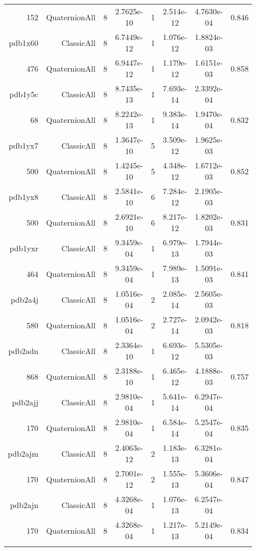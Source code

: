 \begin{xltabular}{\textwidth}{r|rcS[table-format=1.4e+2]cS[table-format=1.3e+2]S[table-format=1.4e+2]S[table-format=-1.3]}
152 & QuaternionAll & 8 & 2.7625e-10 & 1 & 2.514e-12 & 4.7630e-04 & 0.846\\  \addlinespace
pdb1x60 & ClassicAll & 8 & 6.7449e-12 & 1 & 1.076e-12 & 1.8824e-03 & \\
476 & QuaternionAll & 8 & 6.9447e-12 & 1 & 1.179e-12 & 1.6151e-03 & 0.858\\  \addlinespace
pdb1y5c & ClassicAll & 8 & 8.7435e-13 & 1 & 7.693e-14 & 2.3392e-04 & \\
68 & QuaternionAll & 8 & 8.2242e-13 & 1 & 9.383e-14 & 1.9470e-04 & 0.832\\  \addlinespace
pdb1yx7 & ClassicAll & 8 & 1.3647e-10 & 5 & 3.509e-12 & 1.9625e-03 & \\
500 & QuaternionAll & 8 & 1.4245e-10 & 5 & 4.348e-12 & 1.6712e-03 & 0.852\\  \addlinespace
pdb1yx8 & ClassicAll & 8 & 2.5841e-10 & 6 & 7.284e-12 & 2.1905e-03 & \\
500 & QuaternionAll & 8 & 2.6921e-10 & 6 & 8.217e-12 & 1.8202e-03 & 0.831\\  \addlinespace
pdb1yxr & ClassicAll & 8 & 9.3459e-04 & 1 & 6.979e-13 & 1.7944e-03 & \\
464 & QuaternionAll & 8 & 9.3459e-04 & 1 & 7.989e-13 & 1.5091e-03 & 0.841\\  \addlinespace
pdb2a4j & ClassicAll & 8 & 1.0516e-04 & 2 & 2.085e-14 & 2.5605e-03 & \\
580 & QuaternionAll & 8 & 1.0516e-04 & 2 & 2.727e-14 & 2.0942e-03 & 0.818\\  \addlinespace
pdb2adn & ClassicAll & 8 & 2.3364e-10 & 1 & 6.693e-12 & 5.5305e-03 & \\
868 & QuaternionAll & 8 & 2.3188e-10 & 1 & 6.465e-12 & 4.1888e-03 & 0.757\\  \addlinespace
pdb2ajj & ClassicAll & 8 & 2.9810e-04 & 1 & 5.641e-14 & 6.2947e-04 & \\
170 & QuaternionAll & 8 & 2.9810e-04 & 1 & 6.584e-14 & 5.2547e-04 & 0.835\\  \addlinespace
pdb2ajm & ClassicAll & 8 & 2.4063e-12 & 2 & 1.183e-13 & 6.3281e-04 & \\
170 & QuaternionAll & 8 & 2.7001e-12 & 2 & 1.555e-13 & 5.3606e-04 & 0.847\\  \addlinespace
pdb2ajn & ClassicAll & 8 & 4.3268e-04 & 1 & 1.076e-13 & 6.2547e-04 & \\
170 & QuaternionAll & 8 & 4.3268e-04 & 1 & 1.217e-13 & 5.2149e-04 & 0.834\\  \addlinespace

\end{xltabular}
